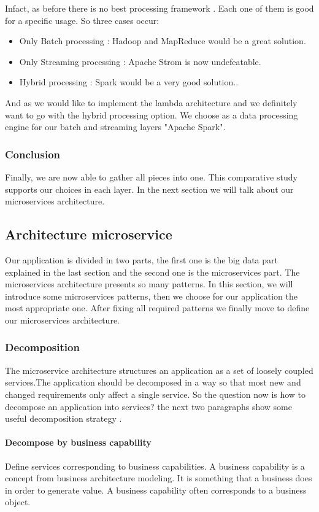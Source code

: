 Infact, as before there is no best processing framework . Each one of them is good for a specific usage.
So three cases occur:
\begin{itemize}
  \item Only Batch processing : Hadoop and MapReduce would be a great solution.
  \item Only Streaming processing : Apache Strom is now undefeatable.
  \item Hybrid processing : Spark would be a very good solution..
\end{itemize}

And as we would like to implement the lambda architecture and we definitely want to go with the hybrid processing 
option. We choose as a data processing engine for our batch and streaming layers "Apache Spark".
\subsubsection{Conclusion}
\label{sec:sec01}
Finally, we are now able to gather all pieces into one. This comparative study supports our choices in 
each layer. In the next section we will talk about our microservices architecture.

\subsection{Architecture microservice}
\label{sec:sec01}
Our application is divided in two parts, the first one is the big data part explained 
in the last section and the second one is the microservices part.
 The microservices architecture presents so many patterns. 
 In this section, we will introduce some microservices patterns, 
 then we choose for our application the most appropriate one. 
 After fixing all required patterns we finally move to define our microservices architecture.

\subsubsection{Decomposition}
\label{sec:sec01}
The microservice architecture structures an application as a set of loosely coupled services.The application 
should be decomposed in a way so that most new and changed requirements only affect a single service.
So the question now is how to decompose an application into services?
the next two paragraphs show some useful decomposition strategy .
\paragraph{Decompose by business capability}
\label{sec:sec01}
Define services corresponding to business capabilities. 
A business capability is a concept from business architecture modeling. 
It is something that a business does in order to generate value. 
A business capability often corresponds to a business object.
